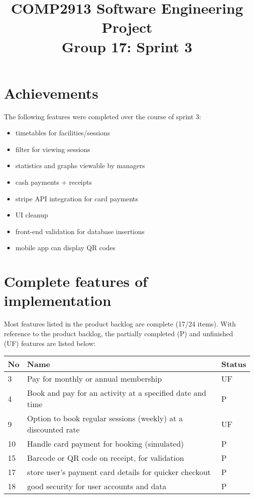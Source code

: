 \documentclass[11pt]{article}
\title{\vspace{-0.7in}COMP2913 Software Engineering Project\\Group  17: Sprint 3}
\author{}
\date{}
\begin{document}
		\maketitle
		\vspace*{-4em}
		\section{Achievements}
		\hspace*{1em}The following features were completed over the course of sprint 3:
			\begin{itemize}
				\setlength\itemsep{-0.5em}
				\vspace*{-0.5em}
				\item timetables for facilities/sessions
				\item filter for viewing sessions
				\item statistics and graphs viewable by managers
				\item cash payments + receipts
				\item stripe API integration for card payments
				\item UI cleanup
				\item front-end validation for database insertions
				\item mobile app can display QR codes	
			\end{itemize}
		\section{Complete features of implementation}
		\hspace*{1em}Most features listed in the product backlog are complete (17/24 items). With reference to the product backlog, the partially completed (P) and unfinished (UF) features are listed below:
		\begin{table}[H]
			\begin{tabular}{|l|l|l|}
				\hline
				\textbf{No} & \textbf{Name}                                                        & \textbf{Status} \\ \hline
				3           & Pay for monthly or annual membership                                 & UF              \\ \hline
				4           & Book and pay for an activity at a specified date and time            & P               \\ \hline
				9           & Option to book regular sessions (weekly) at a discounted rate        & UF              \\ \hline
				10          & Handle card payment for booking (simulated)                          & P               \\ \hline
				15          & Barcode or QR code on receipt, for validation                        & P              \\ \hline
				17          & store user’s payment card details for quicker checkout               & P               \\ \hline
				18          & good security for user accounts and data                             & P               \\ \hline
			\end{tabular}
		\end{table}
		
\end{document}
